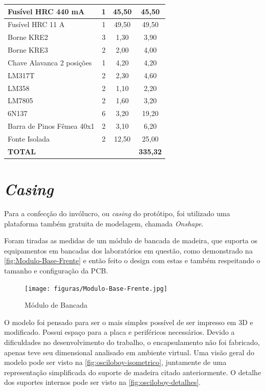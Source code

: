 \begin{table}[h!]
\begin{tabular}{|l|c|c|c|}
Fusível HRC 440 mA & 1 & 45,50 & 45,50 \\ \hline
Fusível HRC 11 A & 1 & 49,50 & 49,50 \\ \hline
Borne KRE2 & 3 & 1,30 & 3,90 \\ \hline
Borne KRE3 & 2 & 2,00 & 4,00 \\ \hline
Chave Alavanca 2 posições & 1 & 4,20 & 4,20 \\ \hline
LM317T & 2 & 2,30 & 4,60 \\ \hline
LM358 & 2 & 1,10 & 2,20 \\ \hline
LM7805 & 2 & 1,60 & 3,20 \\ \hline
6N137 & 6 & 3,20 & 19,20 \\ \hline
Barra de Pinos Fêmea 40x1 & 2 & 3,10 & 6,20 \\ \hline
Fonte Isolada & 2 & 12,50 & 25,00 \\ \hline
\textbf{TOTAL} &  &  & \textbf{335,32} \\ \hline
\end{tabular}
\fonte{}
\end{table}


\section{\textit{Casing}}\label{Casing}

Para a confecção do invólucro, ou \textit{casing} do protótipo, foi utilizado uma plataforma também gratuita de modelagem, chamada \textit{Onshape}.

Foram tiradas as medidas de um módulo de bancada de madeira, que suporta os equipamentos em bancadas dos laboratórios em questão, como demonstrado na \autoref{fig:Modulo-Base-Frente} e então feito o design com estas e também respeitando o tamanho e configuração da \gls{PCB}.

\begin{figure}[htb!]
    \caption{Módulo de Bancada}
    \label{fig:Modulo-Base-Frente}
    \texttt{[image: figuras/Modulo-Base-Frente.jpg]}
    \fonte{}
\end{figure}

O modelo foi pensado para ser o mais simples possível de ser impresso em 3D e modificado. Possui espaço para a placa e periféricos necessários.
Devido a dificuldades no desenvolvimento do trabalho, o encapsulamento não foi fabricado, apenas teve seu dimensional analisado em ambiente virtual.
Uma visão geral do modelo pode ser visto na \autoref{fig:osciloboy-isometrico}, juntamente de uma representação simplificada do suporte de madeira citado anteriormente.
O detalhe dos suportes internos pode ser visto na \autoref{fig:osciloboy-detalhes}.

